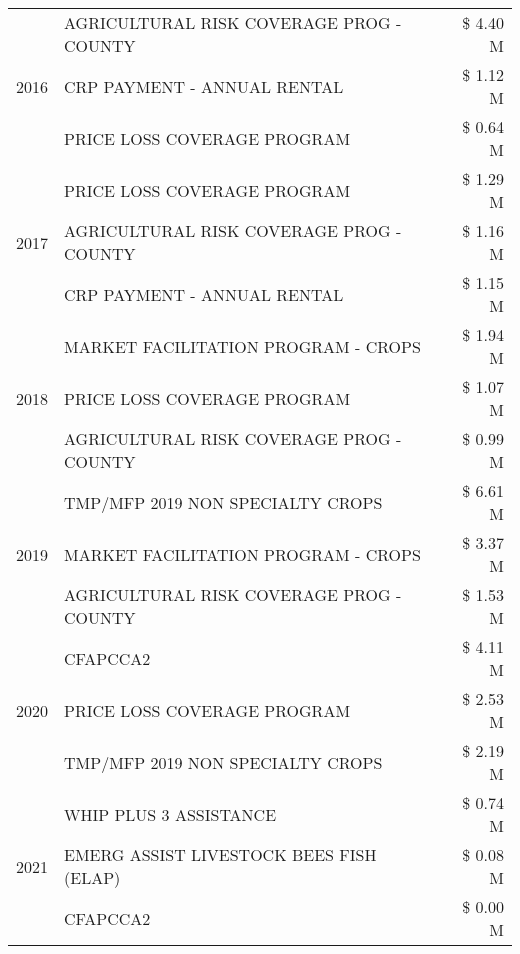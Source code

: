 \begin{tabular}{llr}
\cline{1-3}
\multirow[t]{3}{*}{2016} & AGRICULTURAL RISK COVERAGE PROG - COUNTY & \$ 4.40 M \\
 & CRP PAYMENT - ANNUAL RENTAL & \$ 1.12 M \\
 & PRICE LOSS COVERAGE PROGRAM & \$ 0.64 M \\
\cline{1-3}
\multirow[t]{3}{*}{2017} & PRICE LOSS COVERAGE PROGRAM & \$ 1.29 M \\
 & AGRICULTURAL RISK COVERAGE PROG - COUNTY & \$ 1.16 M \\
 & CRP PAYMENT - ANNUAL RENTAL & \$ 1.15 M \\
\cline{1-3}
\multirow[t]{3}{*}{2018} & MARKET FACILITATION PROGRAM - CROPS & \$ 1.94 M \\
 & PRICE LOSS COVERAGE PROGRAM & \$ 1.07 M \\
 & AGRICULTURAL RISK COVERAGE PROG - COUNTY & \$ 0.99 M \\
\cline{1-3}
\multirow[t]{3}{*}{2019} & TMP/MFP 2019 NON SPECIALTY CROPS & \$ 6.61 M \\
 & MARKET FACILITATION PROGRAM - CROPS & \$ 3.37 M \\
 & AGRICULTURAL RISK COVERAGE PROG - COUNTY & \$ 1.53 M \\
\cline{1-3}
\multirow[t]{3}{*}{2020} & CFAPCCA2 & \$ 4.11 M \\
 & PRICE LOSS COVERAGE PROGRAM & \$ 2.53 M \\
 & TMP/MFP 2019 NON SPECIALTY CROPS & \$ 2.19 M \\
\cline{1-3}
\multirow[t]{3}{*}{2021} & WHIP PLUS 3 ASSISTANCE & \$ 0.74 M \\
 & EMERG ASSIST LIVESTOCK BEES FISH (ELAP) & \$ 0.08 M \\
 & CFAPCCA2 & \$ 0.00 M \\
\cline{1-3}
\bottomrule
\end{tabular}
